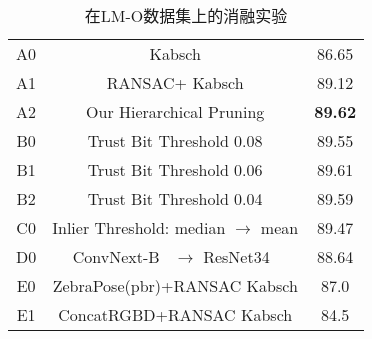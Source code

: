 \begin{table}
  \centering
  \begin{tabular}{@{}c|c|c@{}}
    \toprule
     A0 &Kabsch& 86.65 \\
     A1 &RANSAC+ Kabsch& 89.12 \\
     A2 &Our Hierarchical Pruning &\textbf{89.62}\\
     \midrule
     B0 &Trust Bit Threshold 0.08& 89.55 \\
     B1 &Trust Bit Threshold 0.06& 89.61 \\
     B2 &Trust Bit Threshold 0.04& 89.59 \\
     \midrule
     C0 &Inlier Threshold: median $\rightarrow$ mean & 89.47 \\
     \midrule
     D0 & ConvNext-B~\cite{Liu2022ACF} $\rightarrow$ ResNet34~\cite{He2015DeepRL} & 88.64 \\
     \midrule
     E0 & ZebraPose(pbr)+RANSAC Kabsch&87.0\\
     E1 & ConcatRGBD+RANSAC Kabsch&84.5\\
    \bottomrule
  \end{tabular}
  \caption{在LM-O数据集上的消融实验}
  \label{tab:ablation_study}
\end{table}
